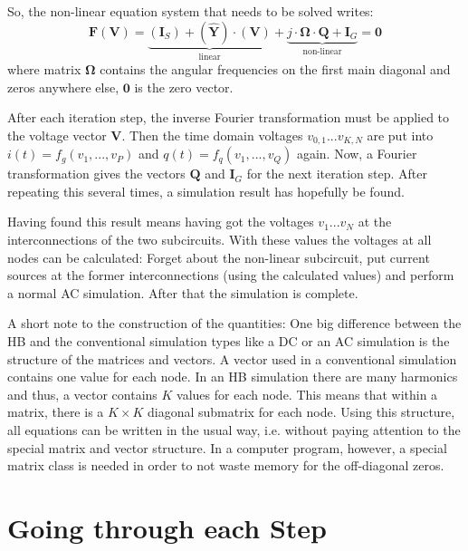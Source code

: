 \addvspace{12pt}

So, the non-linear equation system that needs to be solved writes:
\begin{equation}
\label{eqn:HBeqn}
\textbf{F}(\textbf{V})
  = \underbrace{(\boldsymbol{I}_S) + (\boldsymbol{\hat{Y}})\cdot (\boldsymbol{V})}_{\text{linear}}
  + \underbrace{j\cdot \boldsymbol{\Omega}\cdot \boldsymbol{Q} + \boldsymbol{I}_G}_{\text{non-linear}}
  = \boldsymbol{0}
\end{equation}
where matrix $\boldsymbol{\Omega}$ contains the angular frequencies
on the first main diagonal and zeros anywhere else, $\boldsymbol{0}$
is the zero vector.

\addvspace{12pt}

After each iteration step, the inverse Fourier transformation must
be applied to the voltage vector $\boldsymbol{V}$. Then the time domain
voltages $v_{0,1}...v_{K,N}$ are put into $i(t) = f_g(v_1, ..., v_P)$
and $q(t) = f_q(v_1, ..., v_Q)$ again. Now, a Fourier transformation
gives the vectors $\boldsymbol{Q}$ and $\boldsymbol{I}_G$ for the
next iteration step. After repeating this several times, a simulation
result has hopefully be found.

\addvspace{12pt}

Having found this result means having got the voltages $v_1...v_N$ at
the interconnections of the two subcircuits. With these values the
voltages at all nodes can be calculated: Forget about the non-linear
subcircuit, put current sources at the former interconnections (using
the calculated values) and perform a normal AC simulation. After that
the simulation is complete.

\addvspace{12pt}

A short note to the construction of the quantities: One big difference
between the HB and the conventional simulation types like a DC or an
AC simulation is the structure of the matrices and vectors. A vector
used in a conventional simulation contains one value for each node.
In an HB simulation there are many harmonics and thus, a vector contains
$K$ values for each node. This means that within a matrix, there is a
$K \times K$ diagonal submatrix for each node. Using this structure,
all equations can be written in the usual way, i.e. without paying
attention to the special matrix and vector structure. In a computer
program, however, a special matrix class is needed in order to not
waste memory for the off-diagonal zeros.


\section{Going through each Step}

